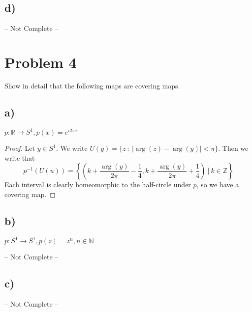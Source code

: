 \documentclass{article}
\theoremstyle{definition}
\begin{document}
    \subsection*{d)}
        -- Not Complete --
\section*{Problem 4}
        Show in detail that the following maps are covering maps.
    \subsection*{a)}
        \begin{mdframed}[]
            $p: \mathbb{R} \rightarrow S^1, p(x) = e^{i2\pi x}$
        \end{mdframed}
        \begin{proof}
            Let $y \in S^1$. We write $U(y) = \{z \ : \ |\arg(z) - \arg(y)| < \pi\}$.
            Then we write that 
            \[
                p^{-1}(U(u)) = \left\{\left(k + \frac{\arg(y)}{2\pi} - \frac{1}{4},k + \frac{\arg(y)}{2\pi} + \frac{1}{4}\right) \ | \ k \in \mathbb{Z} \right\}
            \]
            Each interval is clearly homeomorphic to the half-circle under $p$, so we have a covering map.
        \end{proof}
    \subsection*{b)}
        \begin{mdframed}[]
            $p: S^1 \rightarrow S^1, p(z) = z^n, n \in \mathbb{N}$
        \end{mdframed}
        -- Not Complete -- 
    \subsection*{c)}
    -- Not Complete --
\end{document}
